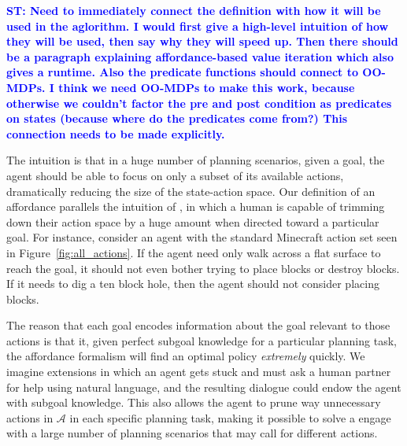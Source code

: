 \documentclass[]{article}
\newcommand{\stnote}[1]{\textcolor{Blue}{\textbf{ST: #1}}}
\begin{document}
\stnote{Need to immediately connect the definition with how it will be
  used in the aglorithm.  I would first give a high-level intuition of
  how they will be used, then say why they will speed up.  Then there
  should be a paragraph explaining affordance-based value iteration
  which also gives a runtime.  Also the predicate functions should
  connect to OO-MDPs.  I think we need OO-MDPs to make this work,
  because otherwise we couldn't factor the pre and post condition as
  predicates on states (because where do the predicates come from?)
  This connection needs to be made explicitly.}

The intuition is that in a huge number of planning scenarios, given a
goal, the agent should be able to focus on only a subset of its
available actions, dramatically reducing the size of the state-action
space. Our definition of an affordance parallels the intuition of
\citet{gibson77}, in which a human is capable of trimming down their
action space by a huge amount when directed toward a particular
goal. For instance, consider an agent with the standard Minecraft
action set seen in Figure~\ref{fig:all_actions}.  If the agent need
only walk across a flat surface to reach the goal, it should not even
bother trying to place blocks or destroy blocks. If it needs to dig a
ten block hole, then the agent should not consider placing blocks.

The reason that each goal encodes information about the goal relevant
to those actions is that it, given perfect subgoal knowledge for a
particular planning task, the affordance formalism will find an
optimal policy {\it extremely} quickly. We imagine extensions in which
an agent gets stuck and must ask a human partner for help using
natural language, and the resulting dialogue could endow the agent
with subgoal knowledge. This also allows the agent to prune way
unnecessary actions in $\mathcal{A}$ in each specific planning task,
making it possible to solve a engage with a large number of planning
scenarios that may call for different actions. 
\end{document}
